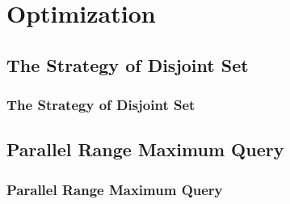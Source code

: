 \section{Optimization}

\subsection{The Strategy of Disjoint Set}
\begin{frame}
    \frametitle{The Strategy of Disjoint Set}
\end{frame}

\subsection{Parallel Range Maximum Query}
\begin{frame}
    \frametitle{Parallel Range Maximum Query}
\end{frame}
